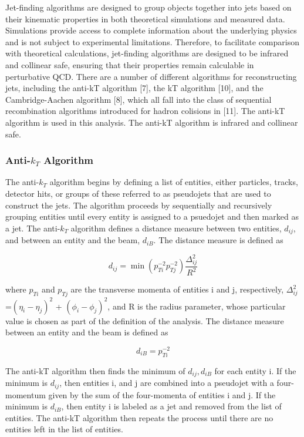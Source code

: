 Jet-finding algorithms are designed to group objects together into jets based on their kinematic properties in both theoretical simulations and measured data. Simulations provide access to complete information about the underlying physics and is not subject to experimental limitations. Therefore, to facilitate comparison with theoretical calculations, jet-finding algorithms are designed to be infrared and collinear safe, ensuring that their properties remain calculable in perturbative QCD. There are a number of different algorithms for reconstructing jets, including the anti-kT algorithm [7], the kT algorithm [10], and the Cambridge-Aachen algorithm [8], which all fall into the class of sequential recombination algorithms introduced for hadron colisions in [11]. The anti-kT algorithm is used in this analysis. The anti-kT algorithm is infrared and collinear safe.

\subsubsection*{Anti-$k_T$ Algorithm}
The anti-$k_T$ algorithm begins by defining a list of entities, either particles, tracks, detector hits, or groups of these referred to as pseudojets that are used to construct the jets. The algorithm proceeds by sequentially and recursively grouping entities until every entity is assigned to a psuedojet and then marked as a jet.  The anti-$k_T$ algorithm defines a distance measure between two entities, $d_{ij}$, and between an entity and the beam, $d_{iB}$. The distance measure is defined as

\begin{equation}
d_{ij} = \min(p_{Ti}^{-2} p_{Tj}^{-2})\frac{\Delta_{ij}^2}{R^2}
\end{equation}

where $p_{Ti}$ and $p_{Tj}$ are the transverse momenta of entities i and j, respectively, $\Delta_{ij}^2$=$(\eta_i - \eta_j )^2$ + $(\phi_i - \phi_j )^2$, and R is the radius parameter, whose particular value is chosen as part of the definition of the analysis. The distance measure between an entity and the beam is defined as

\begin{equation}
d_{iB} = p_{Ti}^{-2}
\end{equation}

The anti-kT algorithm then finds the minimum of ${d_{ij}, d_{iB}}$ for each entity i. If the minimum is $d_{ij}$, then entities i, and j are combined into a pseudojet with a four-momentum given by the sum of the four-momenta of entities i and j. If the minimum is $d_{iB}$, then entity i is labeled as a jet and removed from the list of entities. The anti-kT algorithm then repeats the process until there are no entities left in the list of entities.

